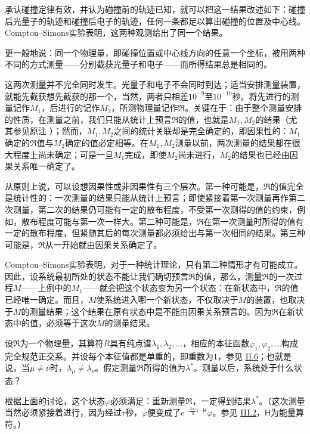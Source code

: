 \documentclass[fontsize=13pt,twoside,openany,headings=normal,parskip=false,bookmarkpackage=false,DIV=calc]{scrbook}
\begin{document}
承认碰撞定律有效，并认为碰撞前的轨迹已知，就可以把这一结果改述如下：碰撞后光量子的轨迹和碰撞后电子的轨迹，任何一条都足以算出碰撞的位置及中心线。Compton–Simons实验表明，这两种观测给出了同一个结果。

更一般地说：同一个物理量，即碰撞位置或中心线方向的任意一个坐标，被用两种不同的方式测量——分别截获光量子和电子——而所得结果总是相同的。

这两次测量并不完全同时发生。光量子和电子不会同时到达；适当安排测量装置，就能先截获想先截获的那一个，当然，两者只相差$10^{-9}$至$10^{-10}$秒。将先进行的测量记作$M_1$，后进行的记作$M_2$，所测物理量记作$\mathfrak R$。关键在于：由于整个测量安排的性质，在测量之前，我们只能从统计上预言$\mathfrak R$的值，也就是$M_1,\allowbreak M_2$的结果（尤其参见原注 \hyperlink{note-123}{}）；然而，$M_1,\allowbreak M_2$之间的统计关联却是完全确定的，即因果性的：$M_1$确定的$\mathfrak R$值与$M_2$确定的值必定相等。在$M_1,\allowbreak M_2$测量以前，两次测量的结果都在很大程度上尚未确定；可是一旦$M_1$完成，即使$M_2$尚未进行，$M_2$的结果也已经由因果关系唯一确定了。

从原则上说，可以设想因果性或非因果性有三个层次。第一种可能是，$\mathfrak R$的值完全是统计性的：一次测量的结果只能从统计上预言；即使紧接着第一次测量再作第二次测量，第二次的结果仍可能有一定的散布程度，不受第一次测得的值的约束，例如，散布程度可能与第一次一样大。\hypertarget{origpage-112}{}\label{origpage-112}第二种可能是，$\mathfrak R$在第一次测量时所得的值有一定的散布程度，但紧随其后的每次测量都必须给出与第一次相同的结果。第三种可能是，$\mathfrak R$从一开始就由因果关系确定了。

Compton–Simons实验表明，对于一种统计理论，只有第二种情形才有可能成立。因此，设系统最初所处的状态不能让我们确切预言$\mathfrak R$的值，那么，测量$\mathfrak R$的一次过程$M$——上例中的$M_1$——就会把这个状态变为另一个状态：在新状态中，$\mathfrak R$的值已经唯一确定。而且，$M$使系统进入哪一个新状态，不仅取决于$M$的装置，也取决于$M$的测量结果；这个结果在原有状态中是不能由因果关系预言的。因为$\mathfrak R$在新状态中的值，必须等于这次$M$的测量结果。

设$\mathfrak R$为一个物理量，其算符$R$具有纯点谱$\lambda_1,\allowbreak \lambda_2,\allowbreak \ldots$，相应的本征函数$\varphi_1,\allowbreak \varphi_2,\allowbreak \ldots$构成完全规范正交系。并设每个本征值都是单重的，即重数为$1$，参见 \hyperref[sec:II.6]{II.6}；也就是说，当$\mu\ne\nu$时，$\lambda_\mu\ne\lambda_\nu$。假定测量$\mathfrak R$所得的值为$\lambda^*$。测量以后，系统处于什么状态？

根据上面的讨论，这个状态$\varphi$必须满足：重新测量$\mathfrak R$，一定得到结果$\lambda^*$。（这次测量当然必须紧接着进行，因为经过$\tau$秒，$\varphi$便变成了$e^{-\frac{2\pi i}h\tau\cdot\mathsf H}\varphi$。参见 \hyperref[sec:III.2]{III.2}，$\mathsf H$为能量算符。）
\end{document}
